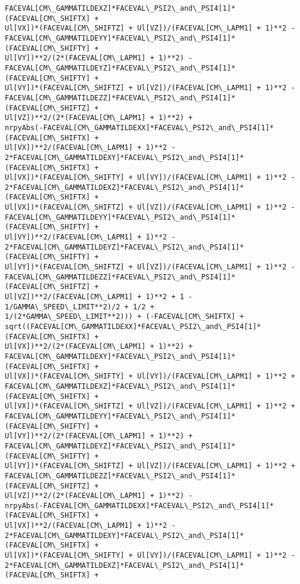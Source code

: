 \documentclass[landscape,letterpaper,10pt,english]{article}
\begin{document}
\begin{Verbatim}[commandchars=\\\{\}]
FACEVAL[CM\_GAMMATILDEXZ]*FACEVAL\_PSI2\_and\_PSI4[1]*(FACEVAL[CM\_SHIFTX] +
Ul[VX])*(FACEVAL[CM\_SHIFTZ] + Ul[VZ])/(FACEVAL[CM\_LAPM1] + 1)**2 -
FACEVAL[CM\_GAMMATILDEYY]*FACEVAL\_PSI2\_and\_PSI4[1]*(FACEVAL[CM\_SHIFTY] +
Ul[VY])**2/(2*(FACEVAL[CM\_LAPM1] + 1)**2) -
FACEVAL[CM\_GAMMATILDEYZ]*FACEVAL\_PSI2\_and\_PSI4[1]*(FACEVAL[CM\_SHIFTY] +
Ul[VY])*(FACEVAL[CM\_SHIFTZ] + Ul[VZ])/(FACEVAL[CM\_LAPM1] + 1)**2 -
FACEVAL[CM\_GAMMATILDEZZ]*FACEVAL\_PSI2\_and\_PSI4[1]*(FACEVAL[CM\_SHIFTZ] +
Ul[VZ])**2/(2*(FACEVAL[CM\_LAPM1] + 1)**2) +
nrpyAbs(-FACEVAL[CM\_GAMMATILDEXX]*FACEVAL\_PSI2\_and\_PSI4[1]*(FACEVAL[CM\_SHIFTX] +
Ul[VX])**2/(FACEVAL[CM\_LAPM1] + 1)**2 -
2*FACEVAL[CM\_GAMMATILDEXY]*FACEVAL\_PSI2\_and\_PSI4[1]*(FACEVAL[CM\_SHIFTX] +
Ul[VX])*(FACEVAL[CM\_SHIFTY] + Ul[VY])/(FACEVAL[CM\_LAPM1] + 1)**2 -
2*FACEVAL[CM\_GAMMATILDEXZ]*FACEVAL\_PSI2\_and\_PSI4[1]*(FACEVAL[CM\_SHIFTX] +
Ul[VX])*(FACEVAL[CM\_SHIFTZ] + Ul[VZ])/(FACEVAL[CM\_LAPM1] + 1)**2 -
FACEVAL[CM\_GAMMATILDEYY]*FACEVAL\_PSI2\_and\_PSI4[1]*(FACEVAL[CM\_SHIFTY] +
Ul[VY])**2/(FACEVAL[CM\_LAPM1] + 1)**2 -
2*FACEVAL[CM\_GAMMATILDEYZ]*FACEVAL\_PSI2\_and\_PSI4[1]*(FACEVAL[CM\_SHIFTY] +
Ul[VY])*(FACEVAL[CM\_SHIFTZ] + Ul[VZ])/(FACEVAL[CM\_LAPM1] + 1)**2 -
FACEVAL[CM\_GAMMATILDEZZ]*FACEVAL\_PSI2\_and\_PSI4[1]*(FACEVAL[CM\_SHIFTZ] +
Ul[VZ])**2/(FACEVAL[CM\_LAPM1] + 1)**2 + 1 - 1/GAMMA\_SPEED\_LIMIT**2)/2 + 1/2 +
1/(2*GAMMA\_SPEED\_LIMIT**2))) + (-FACEVAL[CM\_SHIFTX] +
sqrt((FACEVAL[CM\_GAMMATILDEXX]*FACEVAL\_PSI2\_and\_PSI4[1]*(FACEVAL[CM\_SHIFTX] +
Ul[VX])**2/(2*(FACEVAL[CM\_LAPM1] + 1)**2) +
FACEVAL[CM\_GAMMATILDEXY]*FACEVAL\_PSI2\_and\_PSI4[1]*(FACEVAL[CM\_SHIFTX] +
Ul[VX])*(FACEVAL[CM\_SHIFTY] + Ul[VY])/(FACEVAL[CM\_LAPM1] + 1)**2 +
FACEVAL[CM\_GAMMATILDEXZ]*FACEVAL\_PSI2\_and\_PSI4[1]*(FACEVAL[CM\_SHIFTX] +
Ul[VX])*(FACEVAL[CM\_SHIFTZ] + Ul[VZ])/(FACEVAL[CM\_LAPM1] + 1)**2 +
FACEVAL[CM\_GAMMATILDEYY]*FACEVAL\_PSI2\_and\_PSI4[1]*(FACEVAL[CM\_SHIFTY] +
Ul[VY])**2/(2*(FACEVAL[CM\_LAPM1] + 1)**2) +
FACEVAL[CM\_GAMMATILDEYZ]*FACEVAL\_PSI2\_and\_PSI4[1]*(FACEVAL[CM\_SHIFTY] +
Ul[VY])*(FACEVAL[CM\_SHIFTZ] + Ul[VZ])/(FACEVAL[CM\_LAPM1] + 1)**2 +
FACEVAL[CM\_GAMMATILDEZZ]*FACEVAL\_PSI2\_and\_PSI4[1]*(FACEVAL[CM\_SHIFTZ] +
Ul[VZ])**2/(2*(FACEVAL[CM\_LAPM1] + 1)**2) -
nrpyAbs(-FACEVAL[CM\_GAMMATILDEXX]*FACEVAL\_PSI2\_and\_PSI4[1]*(FACEVAL[CM\_SHIFTX] +
Ul[VX])**2/(FACEVAL[CM\_LAPM1] + 1)**2 -
2*FACEVAL[CM\_GAMMATILDEXY]*FACEVAL\_PSI2\_and\_PSI4[1]*(FACEVAL[CM\_SHIFTX] +
Ul[VX])*(FACEVAL[CM\_SHIFTY] + Ul[VY])/(FACEVAL[CM\_LAPM1] + 1)**2 -
2*FACEVAL[CM\_GAMMATILDEXZ]*FACEVAL\_PSI2\_and\_PSI4[1]*(FACEVAL[CM\_SHIFTX] +

\end{Verbatim}
\end{document}
